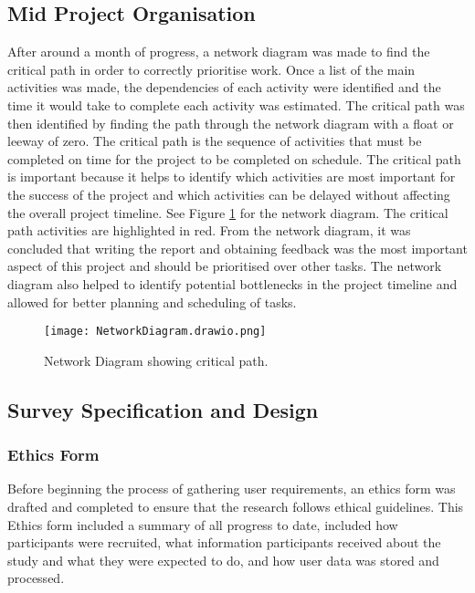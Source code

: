 \subsection{Mid Project Organisation}

After around a month of progress, a network diagram was made to find the critical path in order to correctly prioritise work. Once a list of the main activities was made, the dependencies of each activity were identified and the time it would take to complete each activity was estimated. The critical path was then identified by finding the path through the network diagram with a float or leeway of zero. The critical path is the sequence of activities that must be completed on time for the project to be completed on schedule. The critical path is important because it helps to identify which activities are most important for the success of the project and which activities can be delayed without affecting the overall project timeline. See Figure \ref{figure:network-diagram} for the network diagram. The critical path activities are highlighted in red. From the network diagram, it was concluded that writing the report and obtaining feedback was the most important aspect of this project and should be prioritised over other tasks. The network diagram also helped to identify potential bottlenecks in the project timeline and allowed for better planning and scheduling of tasks.

\begin{figure}[h!!]
  \begin{center}
    \texttt{[image: NetworkDiagram.drawio.png]}
    \caption{Network Diagram showing critical path.}
    \label{figure:network-diagram}
  \end{center}
\end{figure}

\subsection{Survey Specification and Design}

\subsubsection{Ethics Form}
Before beginning the process of gathering user requirements, an ethics form was drafted and completed to ensure that the research follows ethical guidelines. This Ethics form included a summary of all progress to date, included how participants were recruited, what information participants received about the study and what they were expected to do, and how user data was stored and processed. 

